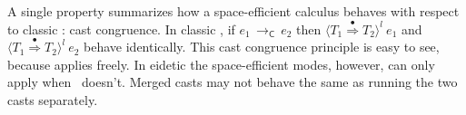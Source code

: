 \documentclass[9pt]{extarticle}
\newcommand{\ottnt}[1]{\mathit{#1}}
\begin{document}
A single property summarizes how a space-efficient calculus behaves
with respect to classic \lambdah: cast congruence.
In classic \lambdah, if $\ottnt{e_{{\mathrm{1}}}} \,  \longrightarrow _{  \mathsf{C}  }  \, \ottnt{e_{{\mathrm{2}}}}$ then $ \langle  \ottnt{T_{{\mathrm{1}}}}  \mathord{ \overset{\bullet}{\Rightarrow} }  \ottnt{T_{{\mathrm{2}}}}  \rangle^{ \ottnt{l} } ~  \ottnt{e_{{\mathrm{1}}}} $ and
$ \langle  \ottnt{T_{{\mathrm{1}}}}  \mathord{ \overset{\bullet}{\Rightarrow} }  \ottnt{T_{{\mathrm{2}}}}  \rangle^{ \ottnt{l} } ~  \ottnt{e_{{\mathrm{2}}}} $ behave identically. This cast congruence principle
is easy to see, because  applies freely.
In \ifpopl eidetic \lambdah\else the space-efficient modes\fi, however,  can only apply
when \ECastMerge\ doesn't. Merged casts may not behave the same as
running the two casts separately.
\end{document}
